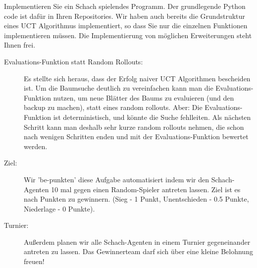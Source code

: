 

\renewcommand{\course}{Artificial Intelligence}
\renewcommand{\coursepicture}{course_ai}
\renewcommand{\coursedate}{Winter 2019}
\renewcommand{\exnum}{2}

\exercises
{}
\exercisestitle



Implementieren Sie ein Schach spielendes Programm. Der grundlegende
Python code ist dafür in Ihren Repositories. Wir haben auch bereits
die Grundstruktur eines UCT Algorithmus implementiert, so dass Sie
nur die einzelnen Funktionen implementieren müssen. Die Implementierung von möglichen Erweiterungen steht Ihnen frei. 
\begin{description}

\item[Evaluations-Funktion statt Random Rollouts:] 
Es stellte sich heraus, dass der Erfolg naiver UCT Algorithmen
bescheiden ist.  Um die Baumsuche deutlich zu vereinfachen kann man die
Evaluations-Funktion nutzen, um neue Blätter des Baums zu evaluieren (und
    den backup zu machen), statt eines random rollouts. Aber: Die
    Evaluations-Funktion ist deterministisch, und könnte die Suche
    fehlleiten. Als nächsten Schritt kann man deshalb sehr kurze random
    rollouts nehmen, die schon nach wenigen Schritten enden und mit der
    Evaluations-Funktion bewertet werden.

\item[Ziel:] Wir 'be-punkten' diese Aufgabe automatisiert
    indem wir den Schach-Agenten 10 mal gegen einen Random-Spieler
    antreten lassen. Ziel ist es nach Punkten zu gewinnern. (Sieg - 1 Punkt, Unentschieden - 0.5 Punkte, Niederlage - 0 Punkte).


\item[Turnier:] Außerdem planen wir alle Schach-Agenten in einem Turnier gegeneinander antreten zu lassen. Das Gewinnerteam darf sich über eine kleine Belohnung freuen!

\end{description}

